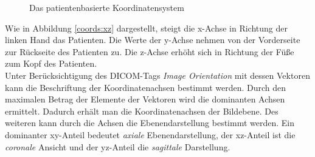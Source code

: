 \begin{figure}[htb]
\centering
{}
\caption{Das patientenbasierte Koordinatensystem}
\label{coords:both}
\end{figure}

Wie in Abbildung \ref{coords:xz} dargestellt, steigt die x-Achse in Richtung der linken Hand das Patienten. Die Werte der y-Achse nehmen von der Vorderseite zur Rückseite des Patienten zu. Die z-Achse erhöht sich in Richtung der Füße zum Kopf des Patienten\cite[C.7.6.2.1.1]{dicom:iod}.\\
Unter Berücksichtigung des DICOM-Tags \textit{Image Orientation} mit dessen Vektoren kann die Beschriftung der Koordinatenachsen bestimmt werden. Durch den maximalen Betrag der Elemente der Vektoren wird die dominanten Achsen ermittelt. Dadurch erhält man die Koordinatenachsen der Bildebene. Des weiteren kann durch die Achsen die Ebenendarstellung bestimmt werden. Ein dominanter xy-Anteil bedeutet \textit{axiale} Ebenendarstellung, der xz-Anteil ist die \textit{coronale} Ansicht und der yz-Anteil die \textit{sagittale} Darstellung.

